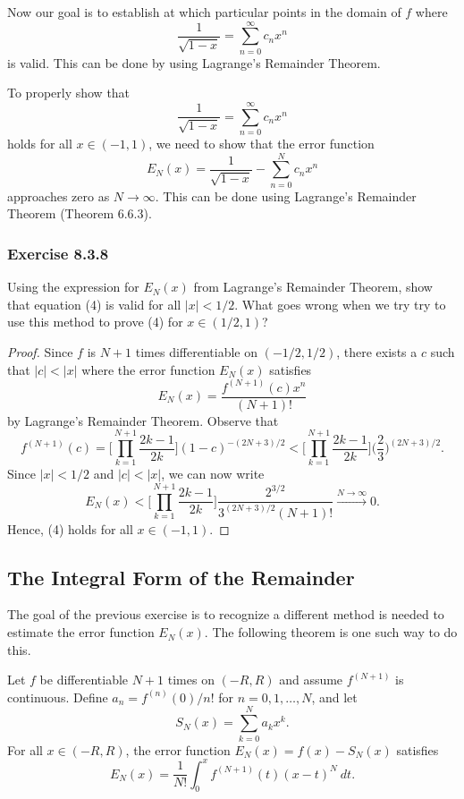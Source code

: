 Now our goal is to establish at which particular points in the domain of \( f  \) where 
\[  \frac{ 1 }{ \sqrt{ 1- x  }  }  = \sum_{ n=0 }^{ \infty  } c_{n} x^{n}  \] is valid. This can be done by using Lagrange's Remainder Theorem. 

To properly show that 
\[  \frac{ 1 }{ \sqrt{ 1-x  }  }  = \sum_{ n=0  }^{ \infty  } c_{n} x^{n}  \]
holds for all \( x \in (-1,1)  \), we need to show that the error function 
\[  E_{N}(x) = \frac{ 1 }{ \sqrt{ 1- x  }  }  - \sum_{ n=0  }^{ N  } c_{n } x^{ n} \]
approaches zero as \( N \to \infty  \). This can be done using Lagrange's Remainder Theorem (Theorem 6.6.3).


\subsubsection{Exercise 8.3.8} Using the expression for \( E_{N}(x)  \) from Lagrange's Remainder Theorem, show that equation (4) is valid for all \( | x  |  < 1 / 2  \). What goes wrong when we try try to use this method to prove (4) for \( x \in (1/2, 1 ) \)?
\begin{proof}
Since \( f  \) is \( N+1  \) times differentiable on \( (-1/2 , 1/ 2 ) \), there exists a \( c  \) such that \( |  c  |  < | x  |  \) where the error function \( E_{N}(x)  \) satisfies 
\[  E_{N}(x) = \frac{ f^{(N+1)}(c)  x^{n }  }{ (N+1)! } \] by Lagrange's Remainder Theorem. 
Observe that 
\[  f^{(N+1)}(c) = \Big[ \prod_{k=1}^{N+1} \frac{ 2k-1  }{ 2k }  \Big]   (1 -c )^{-(2N+3)/2} < \Big[ \prod_{k=1}^{N+1} \frac{ 2k-1  }{ 2k }  \Big]\Big( \frac{ 2 }{ 3 }  \Big)^{ (2N+3)/ 2}.\]
Since \( | x  |  < 1/ 2  \) and \( |  c  | < | x  |  \), we can now write
\[ E_{N}(x) < \Big[ \prod_{k=1}^{N+1} \frac{ 2k-1  }{ 2k }  \Big]\frac{  2^{3/2}}{  3^{(2N+3)/2} (N+1)! } \xrightarrow{N\rightarrow\infty} 0.   \]
Hence, (4) holds for all \( x \in (-1,1) \).
\end{proof}
\subsection{The Integral Form of the Remainder}

The goal of the previous exercise is to recognize a different method is needed to estimate the error function \( E_{N}(x)   \). The following theorem is one such way to do this.

\begin{tcolorbox}
    \begin{thm}
    Let \( f  \) be differentiable \( N+1  \) times on \( (-R,R ) \) and assume \( f^{(N+1)}  \) is continuous. Define \( a_{n} = f^{(n)} (0) / n !   \) for \( n = 0,1 , \dots , N  \), and let 
    \[  S_{N}(x) = \sum_{ k=0 }^{ N   } a_{k } x^{k }.  \] For all \( x \in (-R ,R ) \), the error function \( E_{N}(x) = f(x) - S_{N}(x)   \) satisfies 
    \[  E_{N}(x) = \frac{ 1 }{ N! } \int_{ 0 }^{ x  }  f^{(N+1) }(t) (x-t)^{N} \  dt.  \]
    \end{thm}
\end{tcolorbox}

